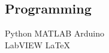 \documentclass[]{deedy-resume-openfont}
\begin{document}
\begin{minipage}[t]{0.33\textwidth}
\subsection{Programming}
Python \textbullet{}   MATLAB \textbullet{} Arduino \\
LabVIEW \textbullet{}  \LaTeX\ \\ 

\sectionsep



%
%

\end{minipage} 
\hfill
\end{document}
